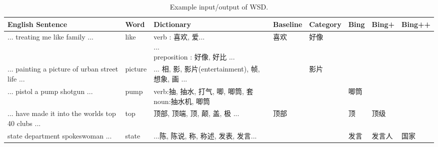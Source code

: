 \begin{CJK}{UTF8}{gbsn}
\begin{table*}[t]
  \caption{Example input/output of WSD.}
  \label{table:wsd_1}
  \begin{center}
  \begin{tabular}{| p{3cm} | p{1cm} | p{3.5cm} | p{1.2cm} | p{1.3cm}| p{0.8cm} | p{0.9cm} | p{1cm} |}
    \hline
    English Sentence & Word & Dictionary & Baseline & Category & Bing & Bing+ & Bing++ \\
    \hline
    ... treating me like family ... & like & \parbox[t]{3cm}{verb : 喜欢, 爱...\\ ... \\preposition : 好像, 好比 ...} & 喜欢 & 好像 & & & \\
    \hline
    ... painting a picture of urban street life ... & picture & \parbox[t]{3cm}{... 相, 影, 影片(entertainment), 帧, 想象, 画 ...} & & 影片 & & & \\
    \hline
    ... pistol a pump shotgun ... & pump & \parbox[t]{3cm}{verb:抽, 抽水, 打气, 唧, 唧筒, 套\\ noun:抽水机, 唧筒} & & & 唧筒 & & \\
    \hline
    ... have made it into the worlds top 40 clubs ... & top & \parbox[t]{3cm}{顶部, 顶端, 顶, 颠, 盖, 极 ...} & 顶部 &  & 顶 & 顶级 & \\
    \hline
    state department spokeswoman ... & state & \parbox[t]{3cm}{...陈, 陈说, 称, 称述, 发表, 发言...} & & & 发言 & 发言人 & 国家 \\
    \hline
  \end{tabular}
  \end{center}
\end{table*}




\end{CJK}
